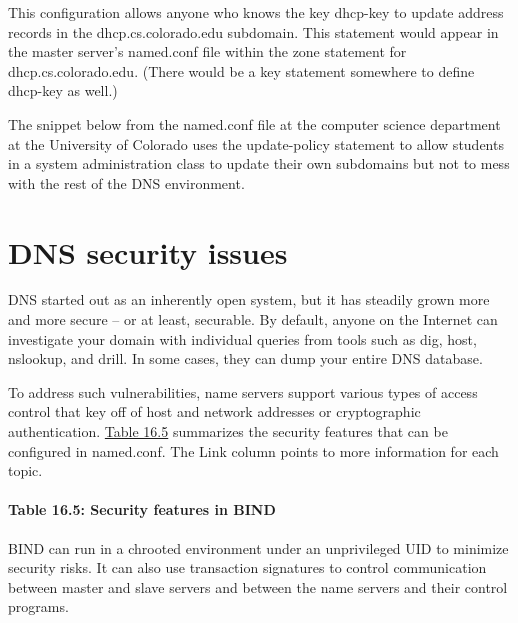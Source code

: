 
This configuration allows anyone who knows the key {dhcp-key} to update
address records in the dhcp.cs.colorado.edu subdomain. This statement
would appear in the master server's {named.conf} file within the {zone}
statement for {dhcp.cs.colorado.edu}. (There would be a {key} statement
somewhere to define {dhcp-key} as well.)

The snippet below from the {named.conf} file at the computer science
department at the University of Colorado uses the {update-policy}
statement to allow students in a system administration class to update
their own subdomains but not to mess with the rest of the DNS
environment.



\section{DNS security issues}

\protect\hypertarget{part0024_split_053.htmlux5cux23_idIndexMarker2232}{}{}DNS
started out as an inherently open system, but it has steadily grown more
and more secure -- or at least, securable. By default, anyone on the
Internet can investigate your domain with individual queries from tools
such as {dig}, {host}, {nslookup}, and {drill}.{ }In some cases, they
can dump your entire DNS database.

To address such vulnerabilities, name servers support various types of
access control that key off of host and network addresses or
cryptographic authentication.
\protect\hyperlink{part0024_split_053.htmlux5cux23_idTextAnchor932}{Table
16.5} summarizes the security features that can be configured in
{named.conf}. The Link column points to more information for each topic.

\paragraph[{Table 16.5: }Security features in
BIND]{\texorpdfstring{{Table 16.5:
}\protect\hypertarget{part0024_split_053.htmlux5cux23_idIndexMarker2233}{}{}\protect\hypertarget{part0024_split_053.htmlux5cux23_idTextAnchor932}{}{}Security
features in BIND}{Table 16.5: Security features in BIND}}


\protect\hypertarget{part0024_split_053.htmlux5cux23_idIndexMarker2234}{}{}BIND
can run in a {chroot}ed environment under an unprivileged UID to
minimize security risks. It can also use transaction signatures to
control communication between master and slave servers and between the
name servers and their control programs.

